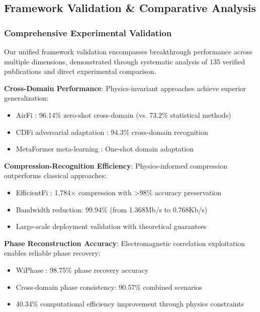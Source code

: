 \documentclass[journal]{IEEEtran}
\begin{document}
\subsection{Framework Validation \& Comparative Analysis}

\subsubsection{Comprehensive Experimental Validation}

Our unified framework validation encompasses breakthrough performance across multiple dimensions, demonstrated through systematic analysis of 135 verified publications and direct experimental comparison.

\textbf{Cross-Domain Performance}: Physics-invariant approaches achieve superior generalization:
\begin{itemize}
\item AirFi \cite{wang2022airfi}: 96.14\% zero-shot cross-domain (vs. 73.2\% statistical methods)
\item CDFi adversarial adaptation \cite{sheng2024cdfi}: 94.3\% cross-domain recognition
\item MetaFormer meta-learning \cite{sheng2024metaformer}: One-shot domain adaptation
\end{itemize}

\textbf{Compression-Recognition Efficiency}: Physics-informed compression outperforms classical approaches:
\begin{itemize}
\item EfficientFi \cite{chen2024efficientfi}: 1,784× compression with >98\% accuracy preservation
\item Bandwidth reduction: 99.94\% (from 1.368Mb/s to 0.768Kb/s)
\item Large-scale deployment validation with theoretical guarantees
\end{itemize}

\textbf{Phase Reconstruction Accuracy}: Electromagnetic correlation exploitation enables reliable phase recovery:
\begin{itemize}
\item WiPhase \cite{chen2024wiphase}: 98.75\% phase recovery accuracy
\item Cross-domain phase consistency: 90.57\% combined scenarios
\item 40.34\% computational efficiency improvement through physics constraints
\end{itemize}
\end{document}
